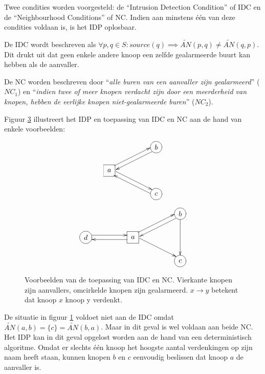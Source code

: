 Twee condities worden voorgesteld: de ``Intrusion Detection Condition'' of IDC
en de ``Neighbourhood Conditions'' of NC. Indien aan minstens \'e\'en van deze
condities voldaan is, is het IDP oplosbaar.

De IDC wordt beschreven als $\forall p,q \in S : source(q) \implies
\tilde{AN}(p,q) \not= \tilde{AN}(q,p)$. Dit drukt uit dat geen enkele andere
knoop een zelfde gealarmeerde buurt kan hebben als de aanvaller.

De NC worden beschreven door ``\emph{alle buren van een aanvaller zijn
gealarmeerd}'' ($NC_1$) en ``\emph{indien twee of meer knopen verdacht zijn door
een meerderheid van knopen, hebben de eerlijke knopen niet-gealarmeerde buren}''
($NC_2$).

Figuur \ref{fig:idp-examples} illustreert het IDP en toepassing van IDC en NC
aan de hand van enkele voorbeelden:

\begin{figure}
\centering
\begin{subfigure}{.49\textwidth}
  \centering
\[ \entrymodifiers={}
 \xymatrix@!=0.75pc {
 *{}                                      & *{} & *-=++[o][F]{b} \ar@<0.7ex>[dll]\\
 *-=++[F]{a} \ar@<0.7ex>[urr] \ar@<0.7ex>[drr]& *{} & *{}                        \\
 *{}                                      & *{} & *-=++[o][F]{c} \ar@<0.7ex>[ull]\\
 }
\]
  \caption{}
  \label{fig:idp-examples-1}
\end{subfigure}
\begin{subfigure}{.49\textwidth}
  \centering
\[ \entrymodifiers={}
 \xymatrix@!=0.75pc {
 *{} & *{} & *{}                                      & *{} & *-=++[o][F]{b} \ar@<0.7ex>[dll] \ar[dd]\\
 *-=++[o][F]{d} \ar@<0.7ex>[rr] & *{} & *-=++[F]{a} \ar@<0.7ex>[ll] \ar@<0.7ex>[urr] \ar@<0.7ex>[drr]& *{} & *{} \\
 *{} & *{} & *{}                                      & *{} & *-=++[o][F]{c} \\
 }
\]
  \caption{}
  \label{fig:idp-examples-2}
\end{subfigure}
\caption{Voorbeelden van de toepassing van IDC en NC. Vierkante knopen zijn
aanvallers, omcirkelde knopen zijn gealarmeerd. $x \rightarrow y$ betekent dat
knoop $x$ knoop y verdenkt.}
\label{fig:idp-examples}
\end{figure}

De situatie in figuur \ref{fig:idp-examples-1} voldoet niet aan de IDC omdat
$\tilde{AN}(a,b) = \{c\} = \tilde{AN}(b,a)$. Maar in dit geval is wel voldaan
aan beide NC. Het IDP kan in dit geval opgelost worden aan de hand van een
deterministisch algoritme. Omdat er slechts \'e\'en knoop het hoogste aantal
verdenkingen op zijn naam heeft staan, kunnen knopen $b$ en $c$ eenvoudig
beslissen dat knoop $a$ de aanvaller is.

